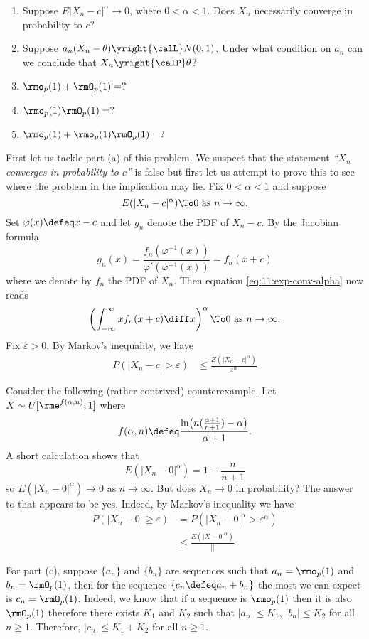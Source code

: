 \begin{problem}[DasGupta 7.2 (a), (b), (c), (d), (e)]
  \begin{enumerate}[label=(\alph*),noitemsep]
  \item Suppose \(E|X_n-c|^\alpha\to 0\), where \(0<\alpha<1\). Does
    \(X_n\) necessarily converge in probability to \(c\)?
  \item Suppose \(a_n(X_n-\theta)\yright{\calL}N(0,1)\). Under what
    condition on \(a_n\) can we conclude that \(X_n\yright{\calP}\theta\)?
  \item \(\rmo_p(1)+\rmO_p(1)=?\)
  \item \(\rmo_p(1)\rmO_p(1)=?\)
  \item \(\rmo_p(1)+\rmo_p(1)\rmO_p(1)=?\)
  \end{enumerate}
\end{problem}
\begin{solution}
  First let us tackle part (a) of this problem. We suspect that the
  statement \emph{``\(X_n\) converges in probability to \(c\)''} is false
  but first let us attempt to prove this to see where the problem in the
  implication may lie. Fix \(0<\alpha<1\) and suppose
  \begin{equation}
    \label{eq:11:exp-conv-alpha}
    E(|X_n-c|^\alpha)
    \To 0%
    \text{ as \(n\to\infty\).}
  \end{equation}
  Set \(\varphi(x)\defeq x-c\) and let \(g_n\) denote the PDF of
  \(X_n-c\). By the Jacobian formula
  \[
    g_n(x)=\frac{f_n(\varphi^{-1}(x))}{\varphi'(\varphi^{-1}(x))}=f_n(x+c)
  \]
  where we denote by \(f_n\) the PDF of \(X_n\). Then equation
  \eqref{eq:11:exp-conv-alpha} now reads
  \[
    \left(\int_{-\infty}^\infty xf_n(x+c)\diff x\right)^\alpha
    \To 0\text{ as \(n\to\infty\).}
  \]
  Fix \(\varepsilon>0\). By Markov's inequality, we have
  \begin{align*}
    P(|X_n-c|>\varepsilon)
    &\leq \frac{E(|X_n-c|^\alpha)}{\varepsilon^\alpha}
  \end{align*}

  Consider the following (rather contrived) counterexample. Let
  \(X\sim U[\rme^{f(\alpha,n)},1]\) where
  \[
    f(\alpha,n)\defeq
    \frac{\ln\bigl(n(\frac{\alpha+1}{n+1})-\alpha\bigr)}{\alpha+1}.
  \]
  A short calculation shows that
  \[
    E(|X_n-0|^\alpha)=1-\frac{n}{n+1}
  \]
  so \(E(|X_n-0|^\alpha)\to 0\) as \(n\to\infty\). But does \(X_n\to 0\) in
  probability? The answer to that appears to be yes. Indeed, by Markov's
  inequality we have
  \begin{align*}
    P(|X_n-0|\geq\varepsilon)
    &=P(|X_n-0|^\alpha>\varepsilon^\alpha)\\
    &\leq\frac{E(|X-0|^\alpha)}{||}
  \end{align*}

  For part (c), suppose \(\{a_n\}\) and \(\{b_n\}\) are sequences such that
  \(a_n=\rmo_p(1)\) and \(b_n=\rmO_p(1)\), then for the sequence
  \(\{c_n\defeq a_n+b_n\}\) the most we can expect is
  \(c_n=\rmO_p(1)\). Indeed, we know that if a sequence is \(\rmo_p(1)\)
  then it is also \(\rmO_p(1)\) therefore there exists \(K_1\) and \(K_2\)
  such that \(|a_n|\leq K_1\), \(|b_n|\leq K_2\) for all \(n\geq
  1\). Therefore, \(|c_n|\leq K_1+K_2\) for all \(n\geq 1\).
\end{solution}
